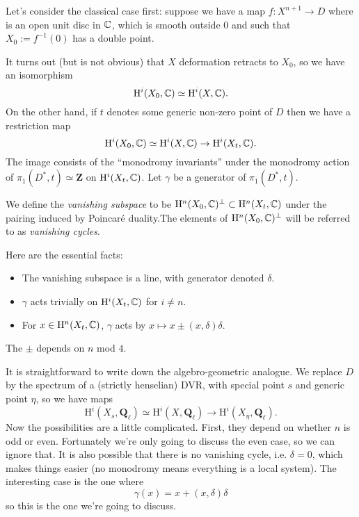 \documentclass[letterpaper,11pt]{article}
\newcommand{\Q}{\mathbf{Q}}
\newcommand{\Z}{\mathbf{Z}}
\newcommand{\ol}[1]{\overline{#1}}
\newcommand{\mrm}[1]{\mathrm{#1}}
\begin{document}
Let's consider the classical case first: suppose we have a map $f \colon X^{n+1} \rightarrow D$ where is an open unit disc in $\mathbb{C}$, which is smooth outside $0$ and such that $X_0 := f^{-1}(0)$ has a double point. 

It turns out (but is not obvious) that $X$ deformation retracts to $X_0$, so we have an isomorphism 
\[
\mrm{H}^i(X_0, \CC) \simeq \mrm{H}^i(X, \CC).
\]
On the other hand, if $t$ denotes some generic non-zero point of $D$ then we have a restriction map 
\[
\mrm{H}^i(X_0, \CC) \simeq \mrm{H}^i(X,\CC) \rightarrow \mrm{H}^i(X_t, \CC).
\]
The image consists of the ``monodromy invariants'' under the monodromy action of $\pi_1(D^*, t) \simeq \Z$ on $\mrm{H}^i(X_t, \CC)$. Let $\gamma$ be a generator of $\pi_1(D^*, t)$. 

\begin{defn}
We define the \emph{vanishing subspace} to be $\mrm{H}^n(X_0, \CC)^{\perp} \subset \mrm{H}^n(X_t, \CC)$ under the pairing induced by Poincar\'{e} duality.The elements of $\mrm{H}^n(X_0, \CC)^{\perp} $ will be referred to as \emph{vanishing cycles}. 
\end{defn}

Here are the essential facts:
\begin{itemize}
\item The vanishing subspace is a line, with generator denoted $\delta$. 
\item $\gamma$ acts trivially on $\mrm{H}^i(X_t, \CC)$ for $i \neq n$. 
\item For $x \in \mrm{H}^n(X_t, \CC)$, $\gamma$ acts by $x \mapsto x \pm (x, \delta) \delta$. 
\end{itemize}

\begin{remark}
The $\pm$ depends on $n$ mod $4$.
\end{remark}


It is straightforward to write down the algebro-geometric analogue. We replace $D$ by the spectrum of a (strictly henselian) DVR, with special point $s$ and generic point $\eta$, so we have maps 
\[
\mrm{H}^i(X_s, \Q_{\ell}) \simeq \mrm{H}^i(X, \Q_{\ell}) \rightarrow \mrm{H}^i(X_{\ol{\eta}}, \Q_{\ell}).
\]
Now the possibilities are a little complicated. First, they depend on whether $n$ is odd or even. Fortunately we're only going to discuss the even case, so we can ignore that. It is also possible that there is no vanishing cycle, i.e. $\delta=0$, which makes things easier (no monodromy means everything is a local system). The interesting case is the one where 
\begin{equation}\label{PL}
\gamma(x) = x + (x,\delta) \delta 
\end{equation}
so this is the one we're going to discuss. 
\end{document}
